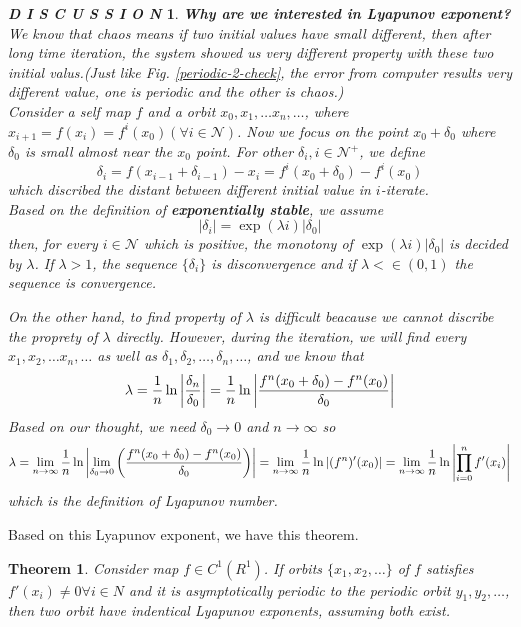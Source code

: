 \documentclass[12pt]{article}
\theoremstyle{plain}
\newtheorem{theorem}{\textbf{Theorem}}[section]
\newtheorem{discussion}{\textit{D I S C U S S I O N}}[section]
\begin{document}
\begin{discussion}\label{Lyapunov-exp-discussion} \textbf{Why are we interested in Lyapunov exponent?}
\\\noindent We know that chaos means if two initial values have small different, then after long time iteration, the system showed us very different property with these two initial valus.(Just like Fig. \ref{periodic-2-check}, the error from computer results very different value, one is periodic and the other is chaos.)
\\\noindent Consider a self map $f$ and a orbit $x_0, x_1, \ldots x_n, \ldots$, where $x_{i+1} = f(x_i) = f^{i}(x_0) (\forall i \in \mathcal N)$. Now we focus on the point $x_0 + \delta_0$ where $\delta_0$ is small almost near the $x_0$ point. For other $\delta_i, i \in \mathcal N^+$, we define 
$$
\delta_i = f(x_{i-1} + \delta_{i-1}) - x_i = f^i(x_0 + \delta_0) - f^i(x_0)
$$
which discribed the distant between different initial value in $i$-iterate.
\\\noindent Based on the definition of \textbf{exponentially stable}, we assume  
$$
|\delta_i| = \exp(\lambda i)|\delta_0|
$$
then, for every $i \in \mathcal N$ which is positive, the monotony of $\exp(\lambda i)|\delta_0|$ is decided by $\lambda$. If $\lambda > 1$, the sequence $\{\delta_i\}$ is disconvergence and if $\lambda < \in (0, 1)$ the sequence is convergence. 

On the other hand, to find property of $\lambda$ is difficult beacause we cannot discribe the proprety of $\lambda$ directly. However, during the iteration, we will find every $x_1, x_2, \ldots x_n, \ldots$ as well as $\delta_1, \delta_2, \ldots, \delta_n, \ldots$, and we know that 
$$
\lambda = {1\over n}\ln{\left|\delta_n \over \delta_0\right|} 
= {1\over n}\ln{\left|f^n(x_0 + \delta_0) - f^n(x_0) \over \delta_0\right|}
$$
Based on our thought, we need $\delta_0 \rightarrow 0$ and $n \rightarrow \infty$ so
$$
\lambda = \lim_{n\rightarrow \infty}{1\over n}\ln{\left|\lim_{\delta_0 \rightarrow 0}\left(f^n(x_0 + \delta_0) - f^n(x_0) \over \delta_0\right)\right|} 
= \lim_{n\rightarrow \infty}{1\over n}\ln{\left|(f^n)'(x_0)\right|} 
= \lim_{n\rightarrow \infty}{1\over n}\ln{\left|\prod_{i = 0}^{n}f'(x_i)\right|} 
$$
which is the definition of Lyapunov number.
\end{discussion}


Based on this Lyapunov exponent, we have this theorem.
\begin{theorem}\label{Lyapunov-exponent-asymptotically-periodic} Consider map $f \in C^1(R^1)$. If orbits $\{x_1, x_2, \ldots\}$ of $f$ satisfies $f'(x_i) \neq 0 \forall i \in N$ and it is asymptotically periodic to the periodic orbit ${y_1, y_2, \ldots}$, then two orbit have indentical Lyapunov exponents, assuming both exist.
\end{theorem}
\end{document}
